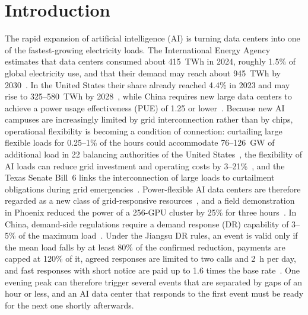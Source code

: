 \section{Introduction}
\label{sec:intro}

The rapid expansion of artificial intelligence (AI) is turning data centers into one of the fastest-growing
electricity loads. The International Energy Agency estimates that data centers consumed about 415~TWh in 2024, roughly
1.5\% of global electricity use, and that their demand may reach about 945~TWh by 2030~\cite{iea2025}. In the United
States their share already reached 4.4\% in 2023 and may rise to 325--580~TWh by 2028~\cite{shehabi2024}, while China
requires new large data centers to achieve a power usage effectiveness (PUE) of 1.25 or lower~\cite{ndrc2024dc}.
Because new AI campuses are increasingly limited by grid interconnection rather than by chips, operational flexibility
is becoming a condition of connection: curtailing large flexible loads for 0.25--1\% of the hours could accommodate
76--126~GW of additional load in 22 balancing authorities of the United States~\cite{norris2025}, the flexibility of AI loads can reduce grid
investment and operating costs by 3--21\%~\cite{chen2026defer}, and the Texas Senate Bill~6 links the interconnection of
large loads to curtailment obligations during grid emergencies~\cite{texas2025sb6}. Power-flexible AI data centers are
therefore regarded as a new class of grid-responsive resources~\cite{williams2026}, and a field demonstration in Phoenix
reduced the power of a 256-GPU cluster by 25\% for three hours~\cite{colangelo2025}. In China, demand-side regulations
require a demand response (DR) capability of 3--5\% of the maximum load~\cite{ndrc2023dsm}. Under the Jiangsu DR rules,
an event is valid only if the mean load falls by at least 80\% of the confirmed reduction, payments are capped at
120\% of it, agreed responses are limited to two calls and 2~h per day, and fast responses with short notice are paid up to 1.6 times
the base rate~\cite{jiangsu2024dr}. One evening peak can therefore trigger several events that are separated by gaps of
an hour or less, and an AI data center that responds to the first event must be ready for the next one shortly
afterwards.


